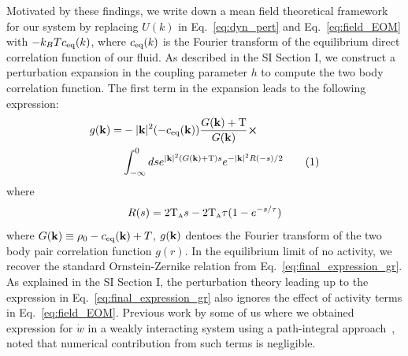 \documentclass[amsmath,preprintnumbers,10pt,nofootinbib,prl,twocolumn]{revtex4-1}
\newcommand{\A}{\text{\tiny{A}}}
\newcommand{\T}{\text{T}}
\newcommand\numberthis{\addtocounter{equation}{1}\tag{\theequation}}
\begin{document}
Motivated by these findings, we write down a mean field theoretical framework for our system by replacing $U(k)$ in Eq.~\ref{eq:dyn_pert} and Eq.~\ref{eq:field_EOM} with $-k_B T c_{\rm eq}(k)$, where $c_{\rm eq}(k)$ is the Fourier transform of the equilibrium direct correlation function of our fluid. As described in the SI Section I, we construct a perturbation expansion in the coupling parameter $h$ to compute the two body correlation function. The first term in the expansion leads to the following expression: 
\begin{align*}\label{eq:final_expression_gr}
g({\bf k}) = &
 -  |{\bf k}|^2 (-c_{\rm eq}({\bf k}))  \dfrac{ G({\bf k}) + \T}{G({\bf k})} \cross \\
& \int
_{-\infty}^0 ds e^{|{\bf k}|^2 ( G({\bf k}) + \T)s}  e^{-|{\bf k}|^2 R(-s)/2}\numberthis
\end{align*}
where 
\begin{equation*}
R(s) = 2\T_\A s - 2 \T_\A \tau (1 - e^{-s/\tau}) 
\end{equation*}
where $G({\bf k}) \equiv \rho_0 -c_{\rm eq}({\bf k}) + T$, $g({\bf k})$ dentoes the Fourier transform of the two body pair correlation function $g(r)$. In the equilibrium limit of no activity, we recover the standard Ornstein-Zernike relation from Eq.~\ref{eq:final_expression_gr}. 
As explained in the SI Section I, the perturbation theory leading up to the expression in Eq.~\ref{eq:final_expression_gr} also ignores the effect of activity terms in Eq.~\ref{eq:field_EOM}. Previous work by some of us where we obtained expression for $\dot{w}$ in a weakly interacting system using a path-integral approach~\cite{Suri2020}, noted that numerical contribution from such terms is negligible. 
\end{document}
